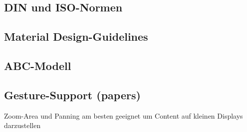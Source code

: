 \subsection{DIN und ISO-Normen}
\subsection{Material Design-Guidelines}
\subsection{ABC-Modell}
\subsection{Gesture-Support (papers)}
  Zoom-Area und Panning am besten geeignet um Content auf kleinen Displays darzustellen \\
  
